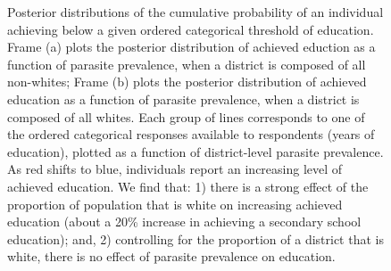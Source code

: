 \documentclass[12pt]{article}
\begin{document}
\begin{figure}
    \centering
    \caption {Posterior distributions of the cumulative probability of an individual achieving below a given ordered categorical threshold of education. Frame (a) plots the posterior distribution of achieved eduction as a function of parasite prevalence, when a district is composed of all non-whites; Frame (b) plots the posterior distribution of achieved education as a function of parasite prevalence, when a district is composed of all whites. Each group of lines corresponds to one of the ordered categorical responses available to respondents (years of education), plotted as a function of district-level parasite prevalence. As red shifts to blue, individuals report an increasing level of achieved education. We find that: 1) there is a strong effect of the proportion of population that is white on increasing achieved education (about a 20\% increase in achieving a secondary school education); and, 2) controlling for the proportion of a district that is white, there is no effect of parasite prevalence on education.}  \label{ALubWhiteEdu}
         
\end{figure} 
\end{document}

